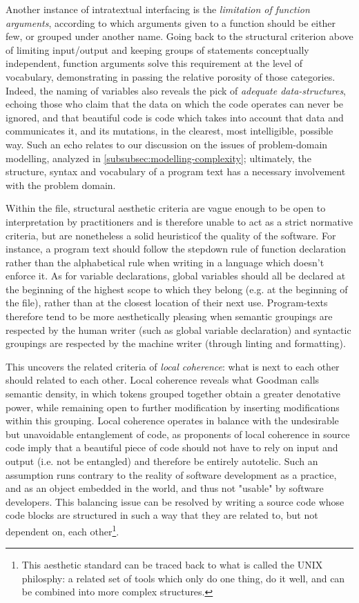 Another instance of intratextual interfacing is the \emph{limitation of function arguments}, according to which arguments given to a function should be either few, or grouped under another name. Going back to the structural criterion above of limiting input/output and keeping groups of statements conceptually independent, function arguments solve this requirement at the level of vocabulary, demonstrating in passing the relative porosity of those categories. Indeed, the naming of variables also reveals the pick of \emph{adequate data-structures}, echoing those who claim that the data on which the code operates can never be ignored, and that beautiful code is code which takes into account that data and communicates it, and its mutations, in the clearest, most intelligible, possible way. Such an echo relates to our discussion on the issues of problem-domain modelling, analyzed in \autoref{subsubsec:modelling-complexity}; ultimately, the structure, syntax and vocabulary of a program text has a necessary involvement with the problem domain.

Within the file, structural aesthetic criteria are vague enough to be open to interpretation by practitioners and is therefore unable to act as a strict normative criteria, but are nonetheless a solid heuristicof the quality of the software. For instance, a program text should follow the stepdown rule of function declaration rather than the alphabetical rule when writing in a language which doesn't enforce it. As for variable declarations, global variables should all be declared at the beginning of the highest scope to which they belong (e.g. at the beginning of the file), rather than at the closest location of their next use. Program-texts therefore tend to be more aesthetically pleasing when semantic groupings are respected by the human writer (such as global variable declaration) and syntactic groupings are respected by the machine writer (through linting and formatting).

This uncovers the related criteria of \emph{local coherence}: what is next to each other should related to each other. Local coherence reveals what Goodman calls semantic density, in which tokens grouped together obtain a greater denotative power, while remaining open to further modification by inserting modifications within this grouping. Local coherence operates in balance with the undesirable but unavoidable entanglement of code, as proponents of local coherence in source code imply that a beautiful piece of code should not have to rely on input and output (i.e. not be entangled) and therefore be entirely autotelic. Such an assumption runs contrary to the reality of software development as a practice, and as an object embedded in the world, and thus not "usable" by software developers. This balancing issue can be resolved by writing a source code whose code blocks are structured in such a way that they are related to, but not dependent on, each other\footnote{This aesthetic standard can be traced back to what is called the UNIX philosphy: a related set of tools which only do one thing, do it well, and can be combined into more complex structures.}.

